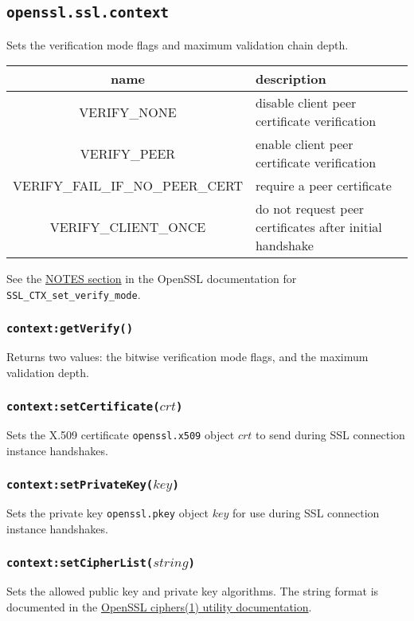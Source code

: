 \documentclass[11pt, oneside]{memoir}
\newcommand*{\fn}[1]{\texttt{#1}\xspace}
\newcommand*{\module}[1]{\texttt{#1}\xspace}
\newcounter{toccols}
\newenvironment{Module}[1]{
	\subsection{\texttt{#1}}
	\addtocontents{toc}{
		\protect\begin{multicols}{\value{toccols}}
	}
}{
	\addtocontents{toc}{\protect\end{multicols}}
}
\begin{document}
\begin{Module}{openssl.ssl.context}
Sets the verification mode flags and maximum validation chain depth.

\begin{tabular}{ c | l }
name & description \\\hline
VERIFY\_NONE & disable client peer certificate verification \\
VERIFY\_PEER & enable client peer certificate verification \\
VERIFY\_FAIL\_IF\_NO\_PEER\_CERT & require a peer certificate \\
VERIFY\_CLIENT\_ONCE & do not request peer certificates after initial handshake
\end{tabular}

See the \href{http://www.openssl.org/docs/ssl/SSL_CTX_set_verify.html#NOTES}{NOTES section} in the OpenSSL documentation for \fn{SSL\_CTX\_set\_verify\_mode}.

\subsubsection[\fn{context:getVerify}]{\fn{context:getVerify()}}

Returns two values: the bitwise verification mode flags, and the maximum validation depth.

\subsubsection[\fn{context:setCertificate}]{\fn{context:setCertificate($crt$)}}

Sets the X.509 certificate \module{openssl.x509} object $crt$ to send during SSL connection instance handshakes.

\subsubsection[\fn{context:setPrivateKey}]{\fn{context:setPrivateKey($key$)}}

Sets the private key \module{openssl.pkey} object $key$ for use during SSL connection instance handshakes.

\subsubsection[\fn{context:setCipherList}]{\fn{context:setCipherList($string$)}}

Sets the allowed public key and private key algorithms. The string format is documented in the \href{http://www.openssl.org/docs/apps/ciphers.html#CIPHER_LIST_FORMAT}{OpenSSL ciphers(1) utility documentation}.


\end{Module}
\end{document}
